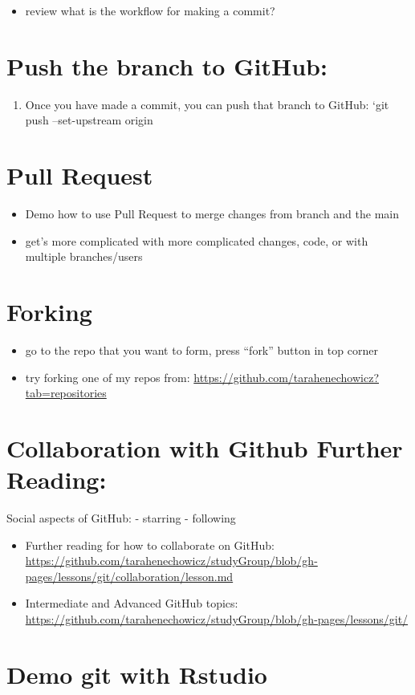 \documentclass[]{article}
\providecommand{\tightlist}{%
  \setlength{\itemsep}{0pt}\setlength{\parskip}{0pt}}
\begin{document}
\begin{itemize}
\tightlist
\item
  review what is the workflow for making a commit?
\end{itemize}

\section{Push the branch to GitHub:}\label{push-the-branch-to-github}

\begin{enumerate}
\def\labelenumi{\arabic{enumi}.}
\setcounter{enumi}{3}
\tightlist
\item
  Once you have made a commit, you can push that branch to GitHub: `git
  push --set-upstream origin 
\end{enumerate}

\section{Pull Request}\label{pull-request}

\begin{itemize}
\tightlist
\item
  Demo how to use Pull Request to merge changes from branch and the main
\item
  get's more complicated with more complicated changes, code, or with
  multiple branches/users
\end{itemize}

\section{Forking}\label{forking}

\begin{itemize}
\tightlist
\item
  go to the repo that you want to form, press ``fork'' button in top
  corner
\item
  try forking one of my repos from:
  \url{https://github.com/tarahenechowicz?tab=repositories}
\end{itemize}

\section{Collaboration with Github Further
Reading:}\label{collaboration-with-github-further-reading}

Social aspects of GitHub: - starring - following

\begin{itemize}
\item
  Further reading for how to collaborate on GitHub:
  \url{https://github.com/tarahenechowicz/studyGroup/blob/gh-pages/lessons/git/collaboration/lesson.md}
\item
  Intermediate and Advanced GitHub topics:
  \url{https://github.com/tarahenechowicz/studyGroup/blob/gh-pages/lessons/git/}
\end{itemize}

\section{Demo git with Rstudio}\label{demo-git-with-rstudio}
\end{document}
